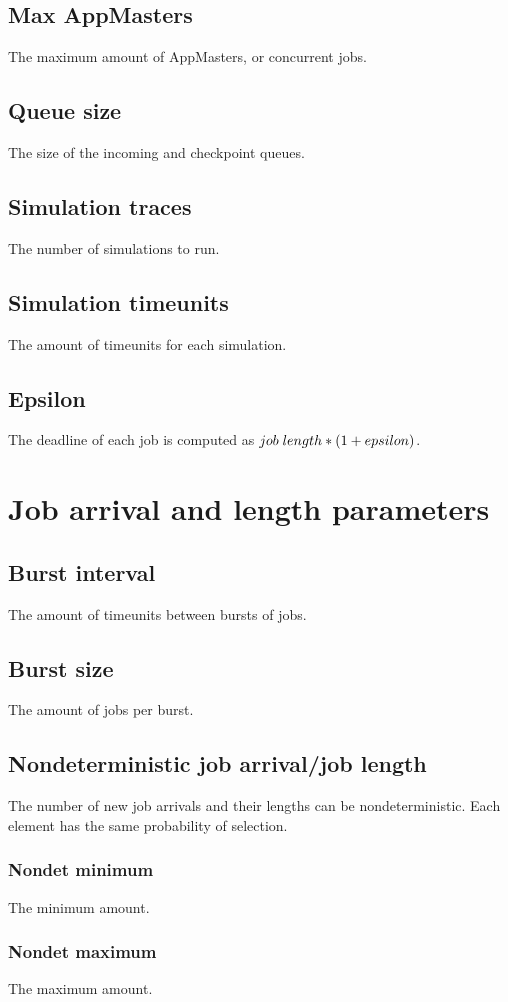 \documentclass[11pt,oneside,a4paper]{article}
\begin{document}
\subsection{Max AppMasters}
The maximum amount of AppMasters, or concurrent jobs.
\subsection{Queue size}
The size of the incoming and checkpoint queues.
\subsection{Simulation traces}
The number of simulations to run.
\subsection{Simulation timeunits}
The amount of timeunits for each simulation.
\subsection{Epsilon}
The deadline of each job is computed as $job \hspace{1mm} length * (1 + epsilon)$.

\section{Job arrival and length parameters}

\subsection{Burst interval}
The amount of timeunits between bursts of jobs.
\subsection{Burst size}
The amount of jobs per burst.

\subsection{Nondeterministic job arrival/job length}
The number of new job arrivals and their lengths can be nondeterministic. Each element has the same probability of selection.
\subsubsection{Nondet minimum}
The minimum amount.
\subsubsection{Nondet maximum}
The maximum amount.
\end{document}
